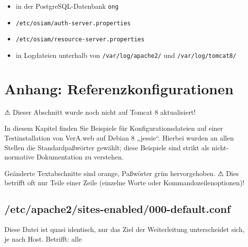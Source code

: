 \begin{itemize}
 \item{in der PostgreSQL-Datenbank \texttt{ong}}
 \item{\texttt{/etc/osiam/auth-server.properties}}
 \item{\texttt{/etc/osiam/resource-server.properties}}
 \item{in Logdateien unterhalb von \texttt{/var/log/apache2/}
  und \texttt{/var/log/tomcat8/}}
\end{itemize}

\fi%

\section{Anhang: Referenzkonfigurationen}\label{sec:refcfg}

⚠ Dieser Abschnitt wurde noch nicht auf Tomcat 8 aktualisiert!

In diesem Kapitel finden Sie Beispiele für Konfigurationsdateien
auf einer Testinstallation von VerA.web auf Debian 8 „jessie“.
Hierbei wurden an allen Stellen die Standardpaßwörter gewählt;
diese Beispiele sind strikt als nicht-normative Dokumentation
zu verstehen.


{\color{RedOrange} Geänderte Textabschnitte} sind orange,
{\color{ForestGreen} Paßwörter} grün hervorgehoben. ⚠ Dies
betrifft oft nur Teile einer Zeile (einzelne Worte oder
Kommandozeilenoptionen)!

\ifoa

\subsection{/etc/apache2/sites-enabled/000-default.conf}\label{subsec:refcfg-apache-default}

Diese Datei ist quasi identisch, nur das Ziel der Weiterleitung
unterscheidet sich, je nach Host. Betrifft: alle

